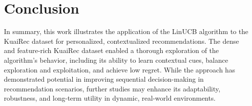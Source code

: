 \section{Conclusion}

In summary, this work illustrates the application of the LinUCB algorithm to the KuaiRec dataset for personalized, contextualized recommendations. The dense and feature-rich KuaiRec dataset enabled a thorough exploration of the algorithm’s behavior, including its ability to learn contextual cues, balance exploration and exploitation, and achieve low regret. While the approach has demonstrated potential in improving sequential decision-making in recommendation scenarios, further studies may enhance its adaptability, robustness, and long-term utility in dynamic, real-world environments.
